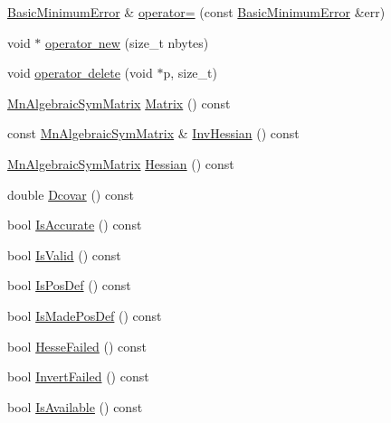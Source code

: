 \begin{DoxyCompactItemize}
\item 
\mbox{\hyperlink{classROOT_1_1Minuit2_1_1BasicMinimumError}{Basic\+Minimum\+Error}} \& \mbox{\hyperlink{classROOT_1_1Minuit2_1_1BasicMinimumError_a83389971838f6e91a3b632604c227571}{operator=}} (const \mbox{\hyperlink{classROOT_1_1Minuit2_1_1BasicMinimumError}{Basic\+Minimum\+Error}} \&err)
\item 
void $\ast$ \mbox{\hyperlink{classROOT_1_1Minuit2_1_1BasicMinimumError_a722b14848c4cb4144f4ba7cdf90e5ef3}{operator new}} (size\+\_\+t nbytes)
\item 
void \mbox{\hyperlink{classROOT_1_1Minuit2_1_1BasicMinimumError_ae64544fb94b090a6a9117243c5fa9f93}{operator delete}} (void $\ast$p, size\+\_\+t)
\item 
\mbox{\hyperlink{namespaceROOT_1_1Minuit2_a9e74ad97f5537a2e80e52b04d98ecc6e}{Mn\+Algebraic\+Sym\+Matrix}} \mbox{\hyperlink{classROOT_1_1Minuit2_1_1BasicMinimumError_aee3316ac5c67df009fb8116b8ca999c4}{Matrix}} () const
\item 
const \mbox{\hyperlink{namespaceROOT_1_1Minuit2_a9e74ad97f5537a2e80e52b04d98ecc6e}{Mn\+Algebraic\+Sym\+Matrix}} \& \mbox{\hyperlink{classROOT_1_1Minuit2_1_1BasicMinimumError_ac488e980cb8e194bc654a8bad791d60d}{Inv\+Hessian}} () const
\item 
\mbox{\hyperlink{namespaceROOT_1_1Minuit2_a9e74ad97f5537a2e80e52b04d98ecc6e}{Mn\+Algebraic\+Sym\+Matrix}} \mbox{\hyperlink{classROOT_1_1Minuit2_1_1BasicMinimumError_a9d247706dc8b8a83d7adf2912eabe91f}{Hessian}} () const
\item 
double \mbox{\hyperlink{classROOT_1_1Minuit2_1_1BasicMinimumError_a9b16fca9ff741ec0959702a5d9dd736e}{Dcovar}} () const
\item 
bool \mbox{\hyperlink{classROOT_1_1Minuit2_1_1BasicMinimumError_ab8a6e5ff16227d3fdaa4ae83fc96edb5}{Is\+Accurate}} () const
\item 
bool \mbox{\hyperlink{classROOT_1_1Minuit2_1_1BasicMinimumError_aa029ef7de1ad9ab763d5731bdea4efbe}{Is\+Valid}} () const
\item 
bool \mbox{\hyperlink{classROOT_1_1Minuit2_1_1BasicMinimumError_a8a7821d2ac317e0dc6a904791de04950}{Is\+Pos\+Def}} () const
\item 
bool \mbox{\hyperlink{classROOT_1_1Minuit2_1_1BasicMinimumError_aa72c861b5feb089fc1418fe282790ec0}{Is\+Made\+Pos\+Def}} () const
\item 
bool \mbox{\hyperlink{classROOT_1_1Minuit2_1_1BasicMinimumError_a10d2ddaff7b0763e5a710890b045b3e7}{Hesse\+Failed}} () const
\item 
bool \mbox{\hyperlink{classROOT_1_1Minuit2_1_1BasicMinimumError_ac93ba151cf6ea3bbc330dd715764de2f}{Invert\+Failed}} () const
\item 
bool \mbox{\hyperlink{classROOT_1_1Minuit2_1_1BasicMinimumError_a8f0c2bba7091677b5cd4438970ca8950}{Is\+Available}} () const
\end{DoxyCompactItemize}


